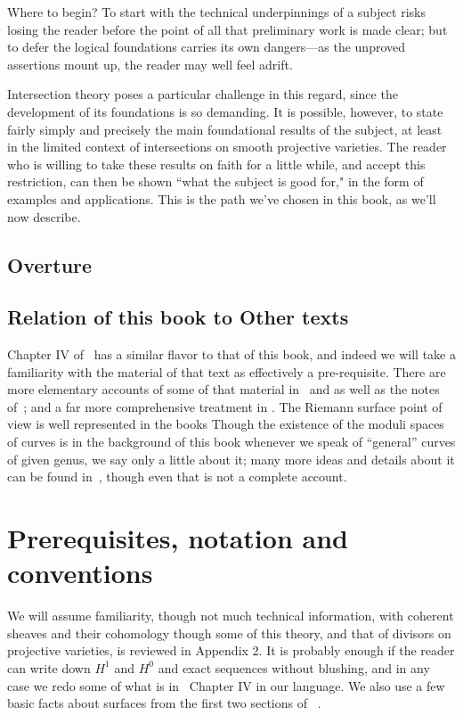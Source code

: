 Where to begin? To start with the technical underpinnings of a subject risks losing the reader before the point of all that preliminary work is made clear; but to defer the logical foundations carries its own dangers---as the unproved assertions mount up, the reader may well feel adrift.

Intersection theory poses a particular challenge in this regard, since the development of its foundations is so demanding. It is possible, however, to state fairly simply and precisely the main foundational results of the subject, at least in the limited context of intersections on smooth projective varieties. The reader who is willing to take these results on faith for a little while, and accept this restriction, can then be shown ``what the subject is good for," in the form of examples and applications. This is the path we've chosen in this book, as we'll now describe.

\subsection{Overture}



\subsection{Relation of this book to Other texts} 
Chapter IV of~\cite{Hartshorne1977} has a similar flavor to that of this book, and indeed we will take a familiarity with the material of that text as effectively a pre-requisite.
There are more elementary accounts of some of that material in~\cite{ Fulton **** } and \cite{Walker} as well as the notes of~\cite{Griffiths***}; and a far more comprehensive treatment in \cite{ACGH}. The Riemann surface point of view is well represented in the books \cite{Forster} \cite{Gunning} \cite{Kirwan}\cite{Miranda}Though the existence of the moduli spaces of curves is in the background of this book whenever we speak of ``general'' curves of given genus, we say only a little about it; many more ideas and details about it can be found in~\cite{Harris-Morrison}, though even that is not a complete account.


\section{Prerequisites, notation and conventions}

We will assume familiarity, though not much technical information, with coherent sheaves and their cohomology though some of this theory, and that of divisors on projective 
varieties, is reviewed in Appendix 2. It is probably enough if the reader can write down $H^1$ and $H^0$ and exact sequences without blushing, and in any case we redo some of what is in~\cite[Chapter IV]{Hartshorne1977}  Chapter IV in our language. We also use a few basic facts about surfaces from the first two sections of ~\cite[Chapter IV]{Hartshorne1977}.

